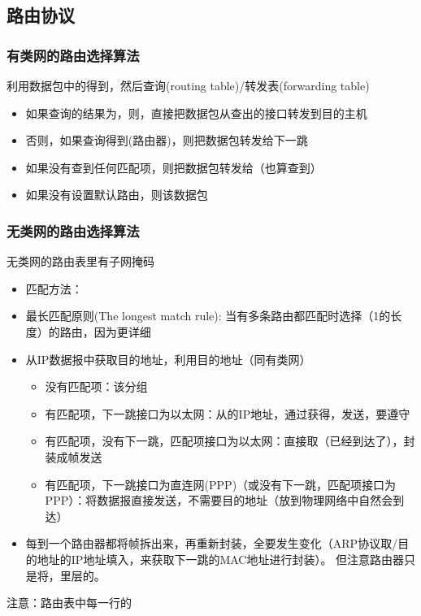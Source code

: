
\subsection{路由协议}
\subsubsection{有类网的路由选择算法}
利用数据包中的得到，然后查询(routing table)/转发表(forwarding table)
\begin{itemize}
	\item 如果查询的结果为，则，直接把数据包从查出的接口转发到目的主机
	\item 否则，如果查询得到(路由器)，则把数据包转发给下一跳
	\item 如果没有查到任何匹配项，则把数据包转发给（也算查到）
	\item 如果没有设置默认路由，则该数据包
\end{itemize}

\subsubsection{无类网的路由选择算法}
无类网的路由表里有子网掩码
\begin{itemize}
	\item 匹配方法：
	\item 最长匹配原则(The longest match rule): 当有多条路由都匹配时选择（1的长度）的路由，因为更详细
	\item 从IP数据报中获取目的地址，利用目的地址（同有类网）
	\begin{itemize}
		\item 没有匹配项：该分组
		\item 有匹配项，下一跳接口为以太网：从的IP地址，通过获得，发送，要遵守
		\item 有匹配项，没有下一跳，匹配项接口为以太网：直接取（已经到达了），封装成帧发送
		\item 有匹配项，下一跳接口为直连网(PPP)（或没有下一跳，匹配项接口为PPP）：将数据报直接发送，不需要目的地址（放到物理网络中自然会到达）
	\end{itemize}
	\item 每到一个路由器都将帧拆出来，再重新封装，全要发生变化（ARP协议取/目的地址的IP地址填入，来获取下一跳的MAC地址进行封装）。
	但注意路由器只是将，里层的。
\end{itemize}
注意：路由表中每一行的

